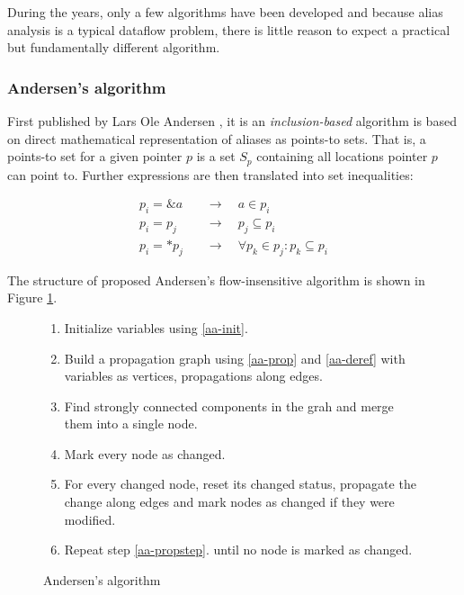 During the years, only a few algorithms have been developed and because alias
analysis is a typical dataflow problem, there is little reason to expect a
practical but fundamentally different algorithm.

\subsubsection{Andersen's algorithm}

First published by Lars Ole Andersen \cite{Andersen94}, it is an {\it
inclusion-based} algorithm is based on direct mathematical representation of
aliases as points-to sets. That is, a points-to set for a given pointer $p$ is a
set $S_p$ containing all locations pointer $p$ can point to.  Further
expressions are then translated into set inequalities:

\begin{align}
	\label{aa-init}
	p_i = \&a \quad &\to \quad a \in p_i \\
	\label{aa-prop}
	p_i = p_j \quad &\to \quad p_j \subseteq p_i \\
	\label{aa-deref}
	p_i = *p_j \quad &\to \quad \forall p_k \in p_j : p_k \subseteq p_i
\end{align}

The structure of proposed Andersen's flow-insensitive algorithm is shown in Figure
\ref{figure-andersen}.

\begin{figure}[h!]
\begin{tcolorbox}
\begin{enumerate}
	\item Initialize variables using \ref{aa-init}.
	\item Build a propagation graph using \ref{aa-prop} and \ref{aa-deref}
		with variables as vertices, propagations along edges.
	\item Find strongly connected components in the grah and merge them into a single node.
	\item Mark every node as changed.
	\item For every changed node, reset its changed status, propagate the change
		along edges and mark nodes as changed if they were modified.
	\label{aa-propstep} 
	\item Repeat step \ref{aa-propstep}. until no node is marked as changed.
\end{enumerate}
\end{tcolorbox}
\caption{Andersen's algorithm}
\label{figure-andersen}
\end{figure}

